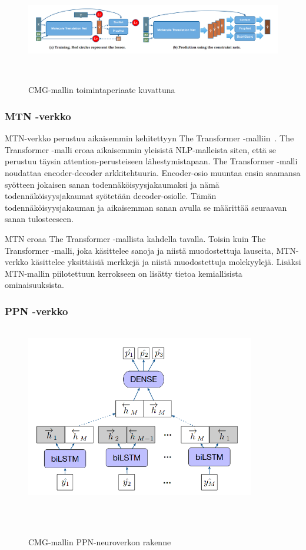 \documentclass[finnish,twoside,censored,tkt,sw-line]{HYthesisML}
\begin{document}
\begin{figure}[!ht]
    \centering
    \includegraphics[width=\textwidth]{CMG-fig.png}
    \caption{CMG-mallin toimintaperiaate kuvattuna}
    {~\cite{ShinBonggun}}
    \label{fig:cmg-model-whole}
\end{figure}

\subsubsection{MTN -verkko}

MTN-verkko perustuu aikaisemmin kehitettyyn The Transformer -malliin~\cite{TheTransformer}.
The Transformer -malli eroaa aikaisemmin yleisistä NLP-malleista siten, että se perustuu täysin attention-perusteiseen lähestymistapaan.
The Transformer -malli noudattaa encoder-decoder arkkitehtuuria.
Encoder-osio muuntaa ensin saamansa syötteen jokaisen sanan todennäköisyysjakaumaksi ja nämä todennäköisyysjakaumat syötetään decoder-osiolle.
Tämän todennäköisyysjakauman ja aikaisemman sanan avulla se määrittää seuraavan sanan tulosteeseen.

MTN eroaa The Transformer -mallista kahdella tavalla.
Toisin kuin The Transformer -malli, joka käsittelee sanoja ja niistä muodostettuja lauseita, MTN-verkko käsittelee yksittäisiä merkkejä ja niistä muodostettuja molekyylejä.
Lisäksi MTN-mallin piilotettuun kerrokseen on lisätty tietoa kemiallisista ominaisuuksista.

\subsubsection{PPN -verkko}

\begin{figure}[!ht]
    \centering
    \includegraphics[width=10cm, height=8cm]{cmg-property-prediction-network.png}
    \caption{CMG-mallin PPN-neuroverkon rakenne}
    {~\cite{ShinBonggun}}
    \label{fig:cmg-model-ppn}
\end{figure}
\end{document}

